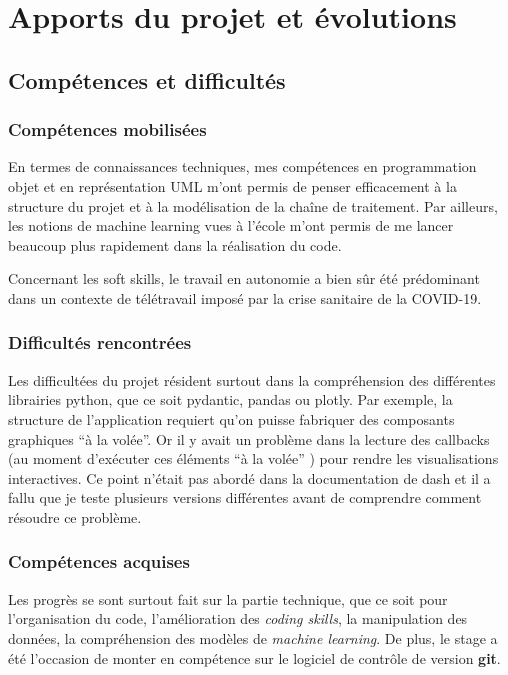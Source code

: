 \part{Apports du projet et évolutions}

\chapter{Compétences et difficultés}

\section{Compétences mobilisées}

En termes de connaissances techniques, mes compétences en programmation objet et en représentation UML m’ont permis de penser efficacement à la structure du projet et à la modélisation de la chaîne de traitement. Par ailleurs, les notions de machine learning vues à l’école m’ont permis de me lancer beaucoup plus rapidement dans la réalisation du code.

Concernant les soft skills, le travail en autonomie a bien sûr été prédominant dans un contexte de télétravail imposé par la crise sanitaire de la COVID-19.

\section{Difficultés rencontrées}

Les difficultées du projet résident surtout dans la compréhension des différentes librairies python, que ce soit pydantic, pandas ou plotly. Par exemple, la structure de l’application requiert qu’on puisse fabriquer des composants graphiques “à la volée”. Or il y avait un problème dans la lecture des callbacks (au moment d’exécuter ces éléments “à la volée” ) pour rendre les visualisations interactives. Ce point n’était pas abordé dans la documentation de dash et il a fallu que je teste plusieurs versions différentes avant de comprendre comment résoudre ce problème.

\section{Compétences acquises}

Les progrès se sont surtout fait sur la partie technique, que ce soit pour l'organisation du code, l'amélioration des \textit{coding skills}, la manipulation des données, la compréhension des modèles de \textit{machine learning}. De plus, le stage a été l'occasion de monter en compétence sur le logiciel de contrôle de version \textbf{git}.


